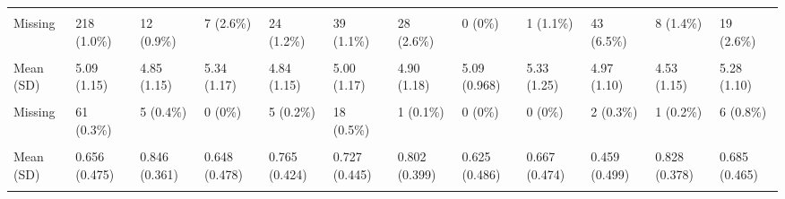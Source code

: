 \documentclass[
  single column]{article}
\begin{document}
\begin{landscape}
\begin{longtable}[t]{llllllllllll}
\cellcolor{gray!10}{Median [Min, Max]} & \cellcolor{gray!10}{59.0 [10.0, 90.0]} & \cellcolor{gray!10}{56.0 [12.0, 90.0]} & \cellcolor{gray!10}{60.0 [18.0, 90.0]} & \cellcolor{gray!10}{59.0 [10.0, 90.0]} & \cellcolor{gray!10}{60.0 [10.0, 90.0]} & \cellcolor{gray!10}{52.0 [10.0, 90.0]} & \cellcolor{gray!10}{63.0 [24.0, 90.0]} & \cellcolor{gray!10}{62.5 [11.0, 90.0]} & \cellcolor{gray!10}{60.0 [11.0, 90.0]} & \cellcolor{gray!10}{48.0 [10.0, 90.0]} & \cellcolor{gray!10}{51.0 [11.0, 90.0]}\\
Missing & 218 (1.0\%) & 12 (0.9\%) & 7 (2.6\%) & 24 (1.2\%) & 39 (1.1\%) & 28 (2.6\%) & 0 (0\%) & 1 (1.1\%) & 43 (6.5\%) & 8 (1.4\%) & 19 (2.6\%)\\
\addlinespace
\cellcolor{gray!10}{openness} & \cellcolor{gray!10}{} & \cellcolor{gray!10}{} & \cellcolor{gray!10}{} & \cellcolor{gray!10}{} & \cellcolor{gray!10}{} & \cellcolor{gray!10}{} & \cellcolor{gray!10}{} & \cellcolor{gray!10}{} & \cellcolor{gray!10}{} & \cellcolor{gray!10}{} & \cellcolor{gray!10}{}\\
Mean (SD) & 5.09 (1.15) & 4.85 (1.15) & 5.34 (1.17) & 4.84 (1.15) & 5.00 (1.17) & 4.90 (1.18) & 5.09 (0.968) & 5.33 (1.25) & 4.97 (1.10) & 4.53 (1.15) & 5.28 (1.10)\\
\cellcolor{gray!10}{Median [Min, Max]} & \cellcolor{gray!10}{5.25 [1.00, 7.00]} & \cellcolor{gray!10}{4.75 [1.00, 7.00]} & \cellcolor{gray!10}{5.42 [1.50, 7.00]} & \cellcolor{gray!10}{5.00 [1.00, 7.00]} & \cellcolor{gray!10}{5.00 [1.00, 7.00]} & \cellcolor{gray!10}{5.00 [1.75, 7.00]} & \cellcolor{gray!10}{5.25 [2.75, 7.00]} & \cellcolor{gray!10}{5.50 [1.75, 7.00]} & \cellcolor{gray!10}{5.00 [1.25, 7.00]} & \cellcolor{gray!10}{4.50 [1.00, 7.00]} & \cellcolor{gray!10}{5.50 [1.25, 7.00]}\\
Missing & 61 (0.3\%) & 5 (0.4\%) & 0 (0\%) & 5 (0.2\%) & 18 (0.5\%) & 1 (0.1\%) & 0 (0\%) & 0 (0\%) & 2 (0.3\%) & 1 (0.2\%) & 6 (0.8\%)\\
\cellcolor{gray!10}{parent\_binary} & \cellcolor{gray!10}{} & \cellcolor{gray!10}{} & \cellcolor{gray!10}{} & \cellcolor{gray!10}{} & \cellcolor{gray!10}{} & \cellcolor{gray!10}{} & \cellcolor{gray!10}{} & \cellcolor{gray!10}{} & \cellcolor{gray!10}{} & \cellcolor{gray!10}{} & \cellcolor{gray!10}{}\\
\addlinespace
Mean (SD) & 0.656 (0.475) & 0.846 (0.361) & 0.648 (0.478) & 0.765 (0.424) & 0.727 (0.445) & 0.802 (0.399) & 0.625 (0.486) & 0.667 (0.474) & 0.459 (0.499) & 0.828 (0.378) & 0.685 (0.465)\\
\cellcolor{gray!10}{Median [Min, Max]} & \cellcolor{gray!10}{1.00 [0, 1.00]} & \cellcolor{gray!10}{1.00 [0, 1.00]} & \cellcolor{gray!10}{1.00 [0, 1.00]} & \cellcolor{gray!10}{1.00 [0, 1.00]} & \cellcolor{gray!10}{1.00 [0, 1.00]} & \cellcolor{gray!10}{1.00 [0, 1.00]} & \cellcolor{gray!10}{1.00 [0, 1.00]} & \cellcolor{gray!10}{1.00 [0, 1.00]} & \cellcolor{gray!10}{0 [0, 1.00]} & \cellcolor{gray!10}{1.00 [0, 1.00]} & \cellcolor{gray!10}{1.00 [0, 1.00]}\\

\end{longtable}
\end{landscape}
\end{document}
